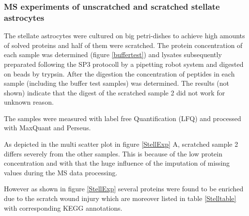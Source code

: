 \documentclass[a4paper,11pt,bibtotocnumbered]{article}
\begin{document}
\subsubsection{MS experiments of unscratched and scratched stellate astrocytes}


The stellate astrocytes were cultured on big petri-dishes to achieve high amounts of solved proteins and half of them were scratched. The protein concentration of each sample was determined (figure \ref{buffertest}) and lysates subsequently preparated following the SP3 protocoll by a pipetting robot system and digested on beads by trypsin. After the digestion the concentration of peptides in each sample (including the buffer test samples) was determined. The results (not shown) indicate that the digest of the scratched sample 2 did not work for unknown reason.

The samples were measured with label free Quantification (LFQ) and processed with MaxQuant and Perseus. 

As depicted in the multi scatter plot in figure \ref{StellExp} A, scratched sample 2 differs severely from the other samples. This is because of the low protein concentration and with that the huge influence of the imputation of missing values during the MS data processing.

However as shown in figure \ref{StellExp} several proteins were found to be enriched due to the scratch wound injury which are moreover listed in table \ref{Stelltable} with corresponding KEGG annotations. 


\end{document}
